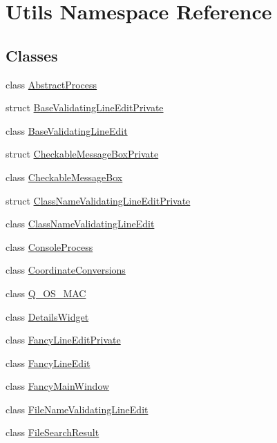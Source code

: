 \hypertarget{namespace_utils}{\section{Utils Namespace Reference}
\label{namespace_utils}
}
\subsection*{Classes}
\begin{DoxyCompactItemize}
\item 
class \hyperlink{class_utils_1_1_abstract_process}{Abstract\-Process}
\item 
struct \hyperlink{struct_utils_1_1_base_validating_line_edit_private}{Base\-Validating\-Line\-Edit\-Private}
\item 
class \hyperlink{class_utils_1_1_base_validating_line_edit}{Base\-Validating\-Line\-Edit}
\item 
struct \hyperlink{struct_utils_1_1_checkable_message_box_private}{Checkable\-Message\-Box\-Private}
\item 
class \hyperlink{class_utils_1_1_checkable_message_box}{Checkable\-Message\-Box}
\item 
struct \hyperlink{struct_utils_1_1_class_name_validating_line_edit_private}{Class\-Name\-Validating\-Line\-Edit\-Private}
\item 
class \hyperlink{class_utils_1_1_class_name_validating_line_edit}{Class\-Name\-Validating\-Line\-Edit}
\item 
class \hyperlink{class_utils_1_1_console_process}{Console\-Process}
\item 
class \hyperlink{class_utils_1_1_coordinate_conversions}{Coordinate\-Conversions}
\item 
class \hyperlink{class_utils_1_1_q___o_s___m_a_c}{Q\-\_\-\-O\-S\-\_\-\-M\-A\-C}
\item 
class \hyperlink{class_utils_1_1_details_widget}{Details\-Widget}
\item 
class \hyperlink{class_utils_1_1_fancy_line_edit_private}{Fancy\-Line\-Edit\-Private}
\item 
class \hyperlink{class_utils_1_1_fancy_line_edit}{Fancy\-Line\-Edit}
\item 
class \hyperlink{class_utils_1_1_fancy_main_window}{Fancy\-Main\-Window}
\item 
class \hyperlink{class_utils_1_1_file_name_validating_line_edit}{File\-Name\-Validating\-Line\-Edit}
\item 
class \hyperlink{class_utils_1_1_file_search_result}{File\-Search\-Result}

\end{DoxyCompactItemize}

